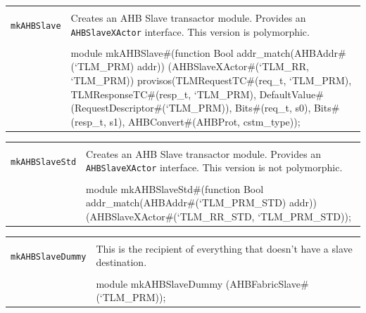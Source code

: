 \documentclass[twoside,letterpaper]{article}
\newcommand{\te}[1]{\texttt{#1}}
\newenvironment{libverbatim}
  {\vspace*{-1.0em}
   \verbatim}
  {\endverbatim
  }
\begin{document}


\begin{center}
\begin{tabular}{|p{1.2 in}|p{5 in}|}
\hline 
&\\
\te{mkAHBSlave}&Creates an AHB Slave transactor module. Provides an
\te{AHBSlaveXActor} interface.  This version is polymorphic.\\
&\\
\cline{2-2}
&\begin{libverbatim}
module mkAHBSlave#(function Bool addr_match(AHBAddr#(`TLM_PRM) addr))
                  (AHBSlaveXActor#(`TLM_RR, `TLM_PRM))
   provisos(TLMRequestTC#(req_t, `TLM_PRM),
            TLMResponseTC#(resp_t, `TLM_PRM),
            DefaultValue#(RequestDescriptor#(`TLM_PRM)),
            Bits#(req_t, s0),
            Bits#(resp_t, s1),
            AHBConvert#(AHBProt, cstm_type));
\end{libverbatim}
\\
\hline
\end{tabular}
\end{center}



\begin{center}
\begin{tabular}{|p{1.2 in}|p{5 in}|}
\hline 
&\\
\te{mkAHBSlaveStd}&Creates an AHB Slave transactor module. Provides an
\te{AHBSlaveXActor} interface.  This version is not polymorphic.\\
&\\
\cline{2-2}
&\begin{libverbatim}
module mkAHBSlaveStd#(function Bool 
                      addr_match(AHBAddr#(`TLM_PRM_STD) addr)) 
                     (AHBSlaveXActor#(`TLM_RR_STD, `TLM_PRM_STD));
\end{libverbatim}
\\
\hline
\end{tabular}
\end{center}



\begin{center}
\begin{tabular}{|p{1.2 in}|p{5 in}|}
\hline 
&\\
\te{mkAHBSlaveDummy}&This is the recipient of everything that doesn't
have a slave destination. \\
&\\
\cline{2-2}
&\begin{libverbatim}
module mkAHBSlaveDummy (AHBFabricSlave#(`TLM_PRM));
\end{libverbatim}
\\
\hline
\end{tabular}
\end{center}
\end{document}
